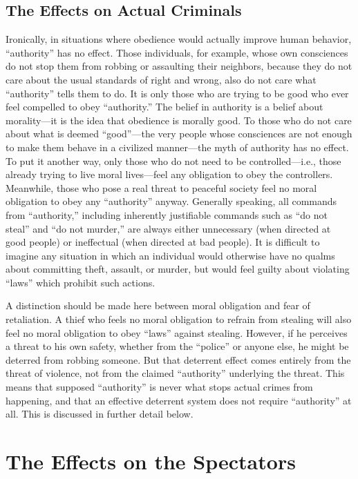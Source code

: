 \documentclass{book}
\begin{document}
\section{The Effects on Actual Criminals}

Ironically, in situations where obedience would actually improve human behavior, \enquote{authority} has no effect. Those individuals, for example, whose own consciences do not stop them from robbing or assaulting their neighbors, because they do not care about the usual standards of right and wrong, also do not care what \enquote{authority} tells them to do. It is only those who are trying to be good who ever feel compelled to obey \enquote{authority.} The belief in authority is a belief about morality---it is the idea that obedience is morally good. To those who do not care about what is deemed \enquote{good}---the very people whose consciences are not enough to make them behave in a civilized manner---the myth of authority has no effect. To put it another way, only those who do not need to be controlled---i.e., those already trying to live moral lives---feel any obligation to obey the controllers. Meanwhile, those who pose a real threat to peaceful society feel no moral obligation to obey any \enquote{authority} anyway. Generally speaking, all commands from \enquote{authority,} including inherently justifiable commands such as \enquote{do not steal} and \enquote{do not murder,} are always either unnecessary (when directed at good people) or ineffectual (when directed at bad people). It is difficult to imagine any situation in which an individual would otherwise have no qualms about committing theft, assault, or murder, but would feel guilty about violating \enquote{laws} which prohibit such actions.

A distinction should be made here between moral obligation and fear of retaliation. A thief who feels no moral obligation to refrain from stealing will also feel no moral obligation to obey \enquote{laws} against stealing. However, if he perceives a threat to his own safety, whether from the \enquote{police} or anyone else, he might be deterred from robbing someone. But that deterrent effect comes entirely from the threat of violence, not from the claimed \enquote{authority} underlying the threat. This means that supposed \enquote{authority} is never what stops actual crimes from happening, and that an effective deterrent system does not require \enquote{authority} at all. This is discussed in further detail below.

\chapter{The Effects on the Spectators}
\end{document}
